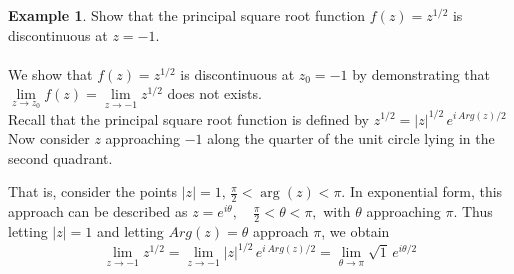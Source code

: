 \documentclass[11pt,a4paper]{article}
\theoremstyle{definition}
\newtheorem{example}[thm]{Example}
\begin{document}
\begin{example}
Show that the principal square root function $f(z) = z^{1/2}$ is discontinuous at $z  = -1$.\\

\text{\textcolor{red}{Solution}}\\
We show that $f(z) = z^{1/2}$ is discontinuous at $z_0 = -1$ by demonstrating that\\  $\lim\limits_{z\rightarrow z_0}f(z) =  \lim\limits_{z\rightarrow -1}z^{1/2}$ does not exists.\\

Recall that the principal square root function is defined by $\displaystyle{z^{1/2} = \left|z\right|^{1/2}\, e^{i\,Arg(z) / 2}}$\\
Now consider $z$ approaching $-1$ along the quarter of the unit circle lying in the second quadrant.


\begin{figure}[H]
\centering
{}
\end{figure}
















That is, consider the points $\left|z\right| = 1, \, \frac{\pi}{2} < \operatorname{arg}(z) < \pi$. In exponential form, this approach can be described as $z = e^{i\theta}, \quad  \frac{\pi}{2}< \theta < \pi,$ with $\theta$ approaching $\pi$. Thus letting $\left|z\right| = 1$ and letting $Arg(z)  = \theta$ approach $\pi$, we obtain
$$ \lim\limits_{z\rightarrow -1}z^{1/2} = \lim\limits_{z\rightarrow -1}\left|z\right|^{1/2}\,e^{i\,Arg(z)/2} = \lim\limits_{\theta\rightarrow \pi}\sqrt{1}\,e^{i\theta / 2}$$


\end{example}
\end{document}
